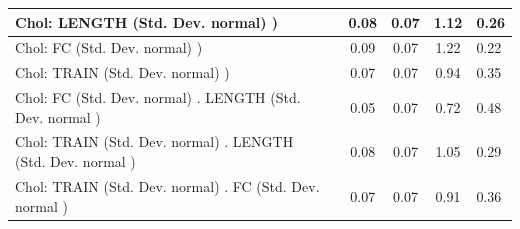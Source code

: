 \begin{table}
\begin{center}
\begin{tabular}{|l|l|c|c|c|l|}
			\hline
			 Chol: LENGTH (Std. Dev. normal) ) &  & 0.08 & 0.07 & 1.12 & 0.26 \\
			\hline
			 Chol: FC (Std. Dev. normal) ) &  & 0.09 & 0.07 & 1.22 & 0.22 \\
			\hline
			 Chol: TRAIN (Std. Dev. normal) ) &  & 0.07 & 0.07 & 0.94 & 0.35 \\
			\hline
			 Chol: FC (Std. Dev. normal) . LENGTH (Std. Dev.   normal ) &  & 0.05 & 0.07 & 0.72 & 0.48 \\
			\hline
			 Chol: TRAIN (Std. Dev. normal) . LENGTH (Std. Dev.   normal ) &  & 0.08 & 0.07 & 1.05 & 0.29 \\
			\hline
			 Chol: TRAIN (Std. Dev. normal) . FC (Std. Dev.   normal ) &  & 0.07 & 0.07 & 0.91 & 0.36 \\
			\hline
		\end{tabular}
	\end{center}
\end{table}